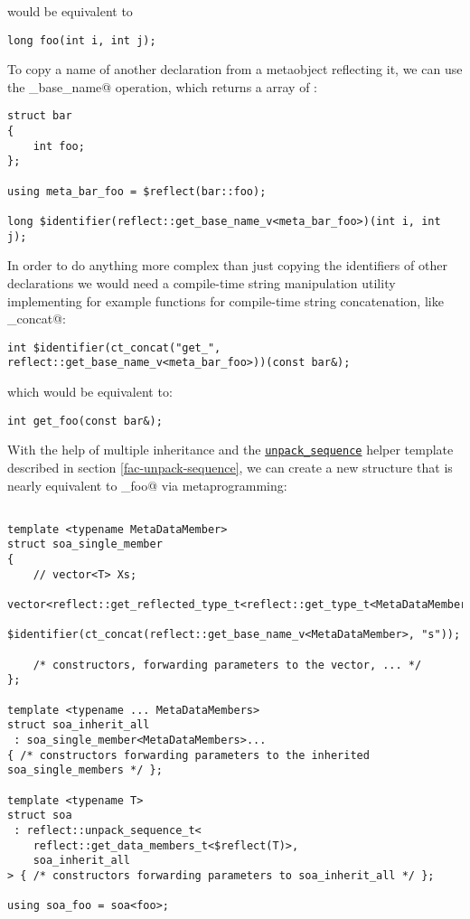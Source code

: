 would be equivalent to 

\begin{verbatim}
long foo(int i, int j);
\end{verbatim}

To copy a name of another declaration from a metaobject reflecting it,
we can use the \verb@get_base_name@ operation, which returns a \verb@constexpr@
array of \verb@char@s:

\begin{verbatim}
struct bar
{
	int foo;
};

using meta_bar_foo = $reflect(bar::foo);

long $identifier(reflect::get_base_name_v<meta_bar_foo>)(int i, int j);
\end{verbatim}

In order to do anything more complex than just
copying the identifiers of other declarations we would need a compile-time
string manipulation utility implementing for example functions for
compile-time string concatenation, like \verb@ct_concat@:

\begin{verbatim}
int $identifier(ct_concat("get_", reflect::get_base_name_v<meta_bar_foo>))(const bar&);
\end{verbatim}

which would be equivalent to:

\begin{verbatim}
int get_foo(const bar&);
\end{verbatim}

With the help of multiple inheritance and the
\hyperref[fac-unpack-sequence]{\texttt{unpack\_sequence}} helper template described
in section \ref{fac-unpack-sequence}, we can create a new structure that is
nearly equivalent to \verb@soa_foo@ via metaprogramming:

\begin{verbatim}

template <typename MetaDataMember>
struct soa_single_member
{
	// vector<T> Xs;
	vector<reflect::get_reflected_type_t<reflect::get_type_t<MetaDataMember>>>
		$identifier(ct_concat(reflect::get_base_name_v<MetaDataMember>, "s"));

	/* constructors, forwarding parameters to the vector, ... */
};

template <typename ... MetaDataMembers>
struct soa_inherit_all
 : soa_single_member<MetaDataMembers>...
{ /* constructors forwarding parameters to the inherited soa_single_members */ };

template <typename T>
struct soa
 : reflect::unpack_sequence_t<
	reflect::get_data_members_t<$reflect(T)>,
	soa_inherit_all
> { /* constructors forwarding parameters to soa_inherit_all */ };

using soa_foo = soa<foo>;
\end{verbatim}

